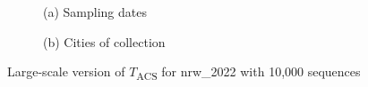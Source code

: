     \clearpage
  \begin{figure}[ht!]
  \centering
    \begin{subfigure}[b]{.8\textwidth}
            
    \caption*{(a) Sampling dates}
    \end{subfigure}
    \par\vspace{1em}
    \begin{subfigure}[b]{.8\textwidth}
            
    \caption*{(b) Cities of collection}
    \end{subfigure}
    \caption{Large-scale version of $T$\textsubscript{ACS} for nrw\_2022 with 10,000 sequences}
    \label{fig:large_scale_sampling_date_acs}
    \end{figure}
    \clearpage
